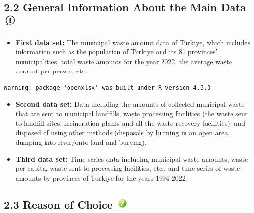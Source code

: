 \documentclass[
  11pt,
  a4paper,
  DIV=11,
  numbers=noendperiod]{scrartcl}
\providecommand{\tightlist}{%
  \setlength{\itemsep}{0pt}\setlength{\parskip}{0pt}}\usepackage{longtable,booktabs,array}
\begin{document}
\subsection[{2.2 General Information About the Main Data}
]{\texorpdfstring{{2.2 General Information About the Main Data}
\protect\includegraphics[width=0.27083in,height=0.23958in]{assets/images/info.jpg}}{2.2 General Information About the Main Data }}\label{general-information-about-the-main-data}

\begin{itemize}
\tightlist
\item
  \textbf{First data set:} The municipal waste amount data of Turkiye,
  which includes information such as the population of Turkiye and its
  81 provinces' municipalities, total waste amounts for the year 2022,
  the average waste amount per person, etc.
\end{itemize}

\begin{verbatim}
Warning: package 'openxlsx' was built under R version 4.3.3
\end{verbatim}

\begin{itemize}
\tightlist
\item
  \textbf{Second data set:} Data including the amounts of collected
  municipal waste that are sent to municipal landfills, waste processing
  facilities (the waste sent to landfill sites, incineration plants and
  all the waste recovery facilities), and disposed of using other
  methods (disposals by burning in an open area, dumping into river/onto
  land and burying).
\end{itemize}

\begin{itemize}
\tightlist
\item
  \textbf{Third data set:} Time series data including municipal waste
  amounts, waste per capita, waste sent to processing facilities, etc.,
  and time series of waste amounts by provinces of Turkiye for the years
  1994-2022.
\end{itemize}

\subsection[{2.3 Reason of Choice} ]{\texorpdfstring{{2.3 Reason of
Choice}
\protect\includegraphics[width=0.26042in,height=0.21875in]{assets/images/reason.jpg}}{2.3 Reason of Choice }}\label{reason-of-choice}
\end{document}
